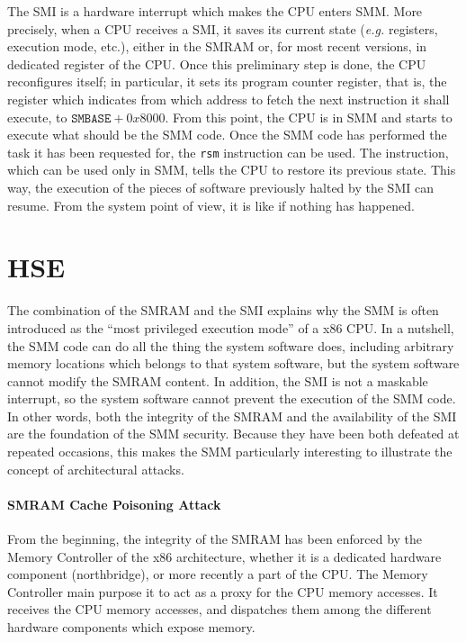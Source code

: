 The SMI is a hardware interrupt which makes the CPU enters SMM.
%
More precisely, when a CPU receives a SMI, it saves its current state
(\emph{e.g.} registers, execution mode, etc.), either in the SMRAM or, for most
recent versions, in dedicated register of the CPU.
%
Once this preliminary step is done, the CPU reconfigures itself;
%
in particular, it sets its program counter register, that is, the register which
indicates from which address to fetch the next instruction it shall execute, to
$\texttt{SMBASE} + 0x8000$.
%
From this point, the CPU is in SMM and starts to execute what should be the SMM
code.
%
Once the SMM code has performed the task it has been requested for, the
\texttt{rsm} instruction can be used.
%
The instruction, which can be used only in SMM, tells the CPU to restore its
previous state.
%
This way, the execution of the pieces of software previously halted by the SMI
can resume.
%
From the system point of view, it is like if nothing has happened.

\section{HSE}
\label{sec:usecase:hse}

The combination of the SMRAM and the SMI explains why the SMM is often
introduced as the ``most privileged execution mode'' of a x86 CPU.
%
In a nutshell, the SMM code can do all the thing the system software does,
including arbitrary memory locations which belongs to that system software, but
the system software cannot modify the SMRAM content.
%
In addition, the SMI is not a maskable interrupt, so the system software cannot
prevent the execution of the SMM code.
%
In other words, both the integrity of the SMRAM and the availability of the SMI
are the foundation of the SMM security.
%
Because they have been both defeated at repeated occasions, this makes the SMM
particularly interesting to illustrate the concept of architectural attacks.

\paragraph{SMRAM Cache Poisoning Attack}
%
From the beginning, the integrity of the SMRAM has been enforced by the Memory
Controller of the x86 architecture, whether it is a dedicated hardware component
(northbridge), or more recently a part of the CPU.
%
The Memory Controller main purpose it to act as a proxy for the CPU memory
accesses.
%
It receives the CPU memory accesses, and dispatches them among the different
hardware components which expose memory.

